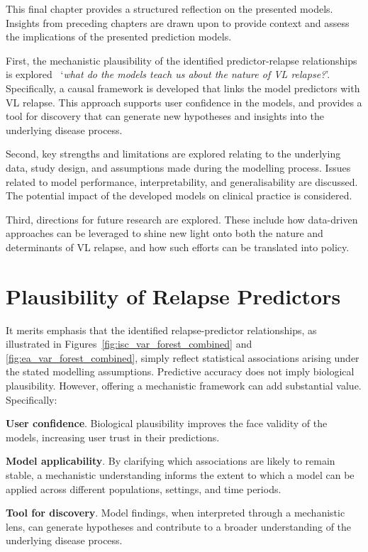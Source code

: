 This final chapter provides a structured reflection on the presented models. Insights from preceding chapters are drawn upon to provide context and assess the implications of the presented prediction models.

First, the mechanistic plausibility of the identified predictor-relapse relationships is explored \textemdash\ `\textit{what do the models teach us about the nature of VL relapse?}'. Specifically, a causal framework is developed that links the model predictors with VL relapse. This approach supports user confidence in the models, and provides a tool for discovery that can generate new hypotheses and insights into the underlying disease process.

Second, key strengths and limitations are explored relating to the underlying data, study design, and assumptions made during the modelling process. Issues related to model performance, interpretability, and generalisability are discussed. The potential impact of the developed models on clinical practice is considered.

Third, directions for future research are explored. These include how data-driven approaches can be leveraged to shine new light onto both the nature and determinants of VL relapse, and how such efforts can be translated into policy.

\section{Plausibility of Relapse Predictors}

It merits emphasis that the identified relapse-predictor relationships, as illustrated in Figures~\ref{fig:isc_var_forest_combined} and \ref{fig:ea_var_forest_combined}, simply reflect statistical associations arising under the stated modelling assumptions. Predictive accuracy does not imply biological plausibility. However, offering a mechanistic framework can add substantial value. Specifically:

\begin{description}
  \item{\textbf{User confidence}}. Biological plausibility improves the face validity of the models, increasing user trust in their predictions.
  \item{\textbf{Model applicability}}. By clarifying which associations are likely to remain stable, a mechanistic understanding informs the extent to which a model can be applied across different populations, settings, and time periods.
  \item{\textbf{Tool for discovery}}. Model findings, when interpreted through a mechanistic lens, can generate hypotheses and contribute to a broader understanding of the underlying disease process.
\end{description}

